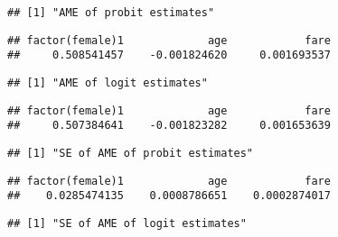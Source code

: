 \documentclass[
  12pt,
]{article}
\newenvironment{Shaded}{\begin{snugshade}}{\end{snugshade}}
\newcommand{\KeywordTok}[1]{\textcolor[rgb]{0.13,0.29,0.53}{\textbf{#1}}}
\newcommand{\NormalTok}[1]{#1}
\newcommand{\OperatorTok}[1]{\textcolor[rgb]{0.81,0.36,0.00}{\textbf{#1}}}
\newcommand{\StringTok}[1]{\textcolor[rgb]{0.31,0.60,0.02}{#1}}
\begin{document}
\begin{verbatim}
## [1] "AME of probit estimates"
\end{verbatim}

\begin{verbatim}
## factor(female)1             age            fare 
##     0.508541457    -0.001824620     0.001693537
\end{verbatim}

\begin{Shaded}
\end{Shaded}

\begin{verbatim}
## [1] "AME of logit estimates"
\end{verbatim}

\begin{verbatim}
## factor(female)1             age            fare 
##     0.507384641    -0.001823282     0.001653639
\end{verbatim}

\begin{Shaded}
\end{Shaded}

\begin{verbatim}
## [1] "SE of AME of probit estimates"
\end{verbatim}

\begin{verbatim}
## factor(female)1             age            fare 
##    0.0285474135    0.0008786651    0.0002874017
\end{verbatim}

\begin{Shaded}
\end{Shaded}

\begin{verbatim}
## [1] "SE of AME of logit estimates"
\end{verbatim}
\end{document}
